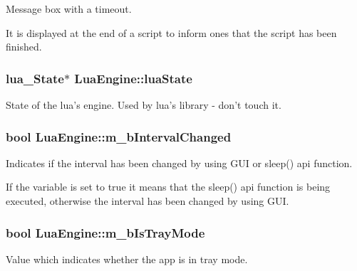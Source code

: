 Message box with a timeout. 

It is displayed at the end of a script to inform ones that the script has been finished. \hypertarget{class_lua_engine_af9593e71b3d33a62cbf9e3080771bff9}{
\subsubsection[{lua\-State}]{\setlength{\rightskip}{0pt plus 5cm}lua\-\_\-\-State$\ast$ Lua\-Engine\-::lua\-State\hspace{0.3cm}{\ttfamily [private]}}}\label{class_lua_engine_af9593e71b3d33a62cbf9e3080771bff9}


State of the lua's engine. Used by lua's library -\/ don't touch it. 

\hypertarget{class_lua_engine_add74083d158ee3543d0644c0b6349c5d}{
\subsubsection[{m\-\_\-b\-Interval\-Changed}]{\setlength{\rightskip}{0pt plus 5cm}bool Lua\-Engine\-::m\-\_\-b\-Interval\-Changed\hspace{0.3cm}{\ttfamily [private]}}}\label{class_lua_engine_add74083d158ee3543d0644c0b6349c5d}


Indicates if the interval has been changed by using G\-U\-I or sleep() api function. 

If the variable is set to true it means that the sleep() api function is being executed, otherwise the interval has been changed by using G\-U\-I. \hypertarget{class_lua_engine_adf80abf3a5f6528dbe5f57e306f60af0}{
\subsubsection[{m\-\_\-b\-Is\-Tray\-Mode}]{\setlength{\rightskip}{0pt plus 5cm}bool Lua\-Engine\-::m\-\_\-b\-Is\-Tray\-Mode\hspace{0.3cm}{\ttfamily [private]}}}\label{class_lua_engine_adf80abf3a5f6528dbe5f57e306f60af0}


Value which indicates whether the app is in tray mode. 


